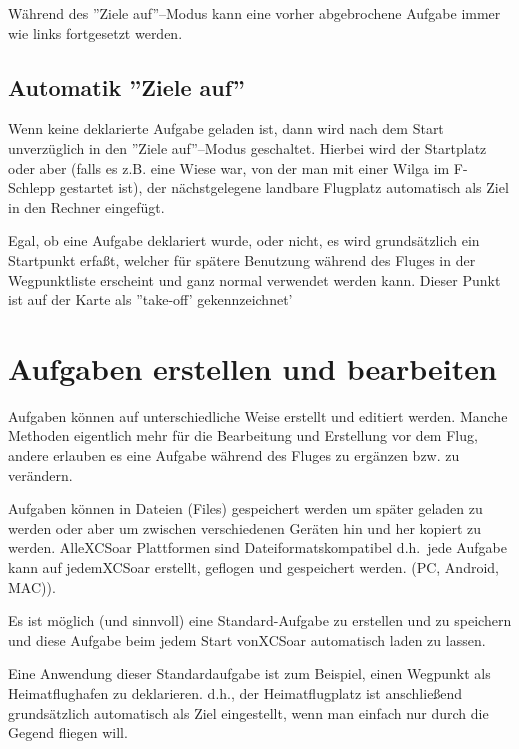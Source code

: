 Während des ''Ziele auf''--Modus  kann eine vorher abgebrochene Aufgabe immer wie links fortgesetzt werden.

\subsection{Automatik ''Ziele auf''}

Wenn keine deklarierte Aufgabe geladen ist, dann wird nach dem Start unverzüglich in den ''Ziele auf''--Modus geschaltet. Hierbei wird der Startplatz oder aber (falls es z.B. eine Wiese war, von der man mit einer Wilga im F-Schlepp gestartet ist), der nächstgelegene landbare Flugplatz automatisch als Ziel in den Rechner eingefügt.

Egal, ob eine Aufgabe deklariert wurde, oder nicht, es wird grundsätzlich ein Startpunkt erfaßt, welcher für spätere Benutzung während des Fluges in der Wegpunktliste erscheint und ganz normal  verwendet werden kann. 
Dieser Punkt ist auf der Karte als ''take-off' gekennzeichnet' 

\section{Aufgaben erstellen und bearbeiten}

Aufgaben können auf unterschiedliche Weise erstellt und editiert  werden. Manche Methoden eigentlich mehr für die Bearbeitung und Erstellung vor dem Flug,  andere erlauben es eine Aufgabe während des Fluges zu ergänzen bzw. zu verändern.

Aufgaben können in Dateien (Files) gespeichert werden um später geladen zu werden oder aber um zwischen verschiedenen Geräten hin und her kopiert zu werden. Alle\textsf{XCSoar} Plattformen sind Dateiformatskompatibel d.h.\  jede Aufgabe kann auf jedem\textsf{XCSoar} erstellt, geflogen und gespeichert werden. (\textsf{PC, Android, MAC)}).

\tip Es ist möglich (und sinnvoll) eine Standard-Aufgabe zu erstellen und zu speichern und diese  Aufgabe beim jedem Start von\textsf{XCSoar} automatisch laden zu lassen.

Eine Anwendung dieser Standardaufgabe ist zum Beispiel, einen Wegpunkt  als Heimatflughafen zu deklarieren. d.h.,  der Heimatflugplatz ist anschließend grundsätzlich automatisch als Ziel eingestellt, wenn man einfach nur durch die Gegend fliegen will.

